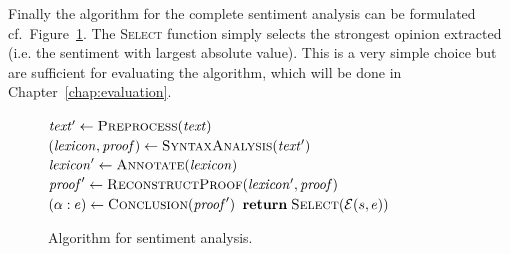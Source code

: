 Finally the algorithm for the complete sentiment analysis can be formulated cf.\ Figure~\ref{algorithm}. The \textsc{Select} function simply selects the strongest opinion extracted (i.e. the sentiment with largest absolute value). This is a very simple choice but are sufficient for evaluating the algorithm, which will be done in Chapter~\ref{chap:evaluation}.
\begin{figure}[ht]
\begin{cframed}{.9\textwidth}
\vspace{-1em}
\begin{codebox}
\zi $\mathit{text'} \leftarrow \textnormal{\scshape Preprocess}(\mathit{text})$
\zi $(\mathit{lexicon}, \mathit{proof}) \leftarrow \textnormal{\scshape SyntaxAnalysis}(\mathit{text}')$
\zi $\mathit{lexicon}' \leftarrow \textnormal{\scshape Annotate}(\mathit{lexicon})$
\zi $\mathit{proof}' \leftarrow \textnormal{\scshape ReconstructProof}(\mathit{lexicon'}, \mathit{proof})$
\zi $(\alpha : e) \leftarrow \textnormal{\scshape Conclusion}(\mathit{proof}')$
\zi $\textbf{return} \; \textnormal{\scshape Select}(\mathcal{E}(s, e))$
\End
\end{codebox}
\end{cframed}
\caption{Algorithm for sentiment analysis.}
\label{algorithm}
\end{figure}


